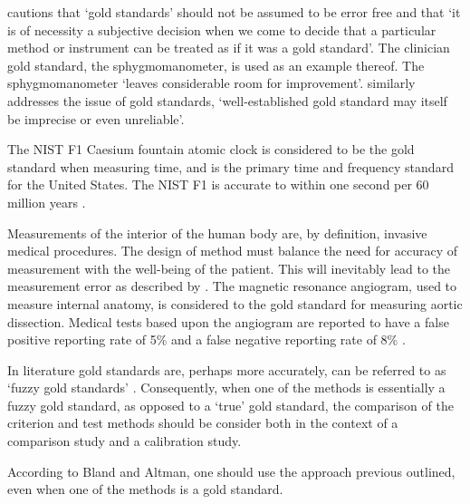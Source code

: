 \documentclass[12pt, a4paper]{report}
\theoremstyle{plain}
\theoremstyle{definition}
\theoremstyle{remark}
\begin{document}
	
	
	\citet[p.47]{DunnSEME} cautions that `gold standards' should not be
	assumed to be error free and that `it is of necessity a subjective
	decision when we come to decide that a particular method or
	instrument can be treated as if it was a gold standard'. The
	clinician gold standard, the sphygmomanometer, is used as an
	example thereof.  The sphygmomanometer `leaves considerable room
	for improvement'. \citet{pizzi} similarly
	addresses the issue of gold standards, `well-established gold
	standard may itself be imprecise or even unreliable'.
	
	
	The NIST F1 Caesium fountain atomic clock is considered to be the
	gold standard when measuring time, and is the primary time and
	frequency standard for the United States. The NIST F1 is accurate
	to within one second per 60 million years \citep{NIST}.
	
	Measurements of the interior of the human body are, by definition,
	invasive medical procedures. The design of method must balance the
	need for accuracy of measurement with the well-being of the
	patient. This will inevitably lead to the measurement error as
	described by \citet{DunnSEME}. The magnetic resonance angiogram,
	used to measure internal anatomy, is considered to the gold
	standard for measuring aortic dissection. Medical tests based upon
	the angiogram are reported to have a false positive reporting rate
	of 5\% and a false negative reporting rate of 8\% \citep{ACR}.
	
	In literature gold standards are, perhaps more accurately, can be referred to as
	`fuzzy gold standards' \citep{phelps}. Consequently, when one of the methods is
	essentially a fuzzy gold standard, as opposed to a `true' gold standard, the comparison of the criterion and test methods should
	be consider both in the context of a comparison study and a	calibration study.
	
	
	According to Bland and Altman, one should use the approach previous outlined, even when one of the methods is a gold standard.
	
	
\end{document}
